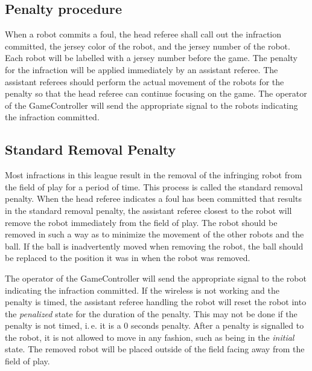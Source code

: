 \documentclass[12pt]{article}
\newcommand{\ie}{\mbox{i.\,e.}\xspace}
\begin{document}
\subsection{Penalty procedure}
\label{sec:penalty_procedure}

When a robot commits a foul, the head referee shall call out the
infraction committed, the jersey color of the robot, and the jersey
number of the robot.  Each robot will be labelled with a jersey
number before the game.  The penalty for the infraction will be
applied immediately by an assistant referee.  The assistant referees
should perform the actual movement of the robots for the penalty so
that the head referee can continue focusing on the game.  The
operator of the GameController will send the appropriate signal to
the robots indicating the infraction committed.

\subsection{Standard Removal Penalty}
\label{sec:removal_penalty}

Most infractions in this league result in the removal of the
infringing robot from the field of play for a period of time.  This
process is called the standard removal penalty.  When the head
referee indicates a foul has been committed that results in the
standard removal penalty, the assistant referee closest to the robot
will remove the robot immediately from the field of play.  The robot
should be removed in such a way as to minimize the movement of the
other robots and the ball.  If the ball is inadvertently moved when
removing the robot, the ball should be replaced to the position it
was in when the robot was removed.

The operator of the GameController will send the appropriate signal
to the robot indicating the infraction committed.
If the wireless is
not working and the penalty is timed, the assistant referee handling
the robot will reset the robot into the \emph{penalized} state for
the duration of the penalty.
This may not be done if the penalty is not
timed, \ie it is a 0 seconds penalty. After a penalty is signalled
to the robot, it is not allowed to move in any fashion, such as being
in the \emph{initial} state. The removed robot will be placed
outside of the field facing away from the field of play.
\end{document}
